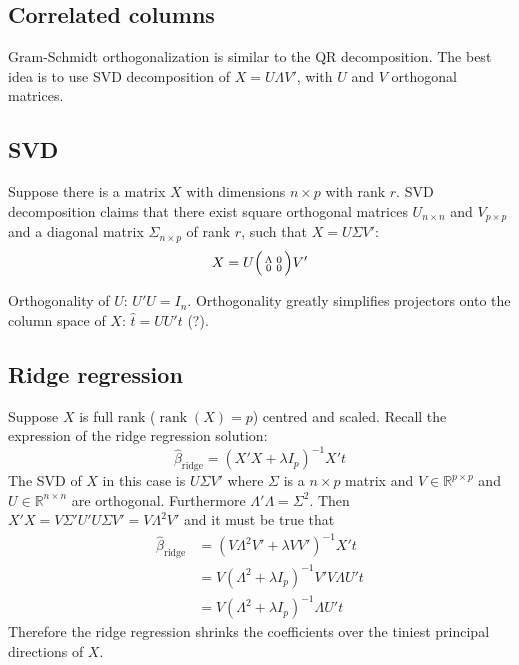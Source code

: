 \documentclass[a4paper]{article}
\newcommand{\Real}{\mathbb{R}}
\newcommand{\rank}{\mathop{\text{rank}}\nolimits}
\begin{document}

\subsection*{Correlated columns} %
\label{sub:correlated_columns}

Gram-Schmidt orthogonalization is similar to the QR decomposition. The best idea
is to use SVD decomposition of $X = U\Lambda V'$, with $U$ and $V$ orthogonal
matrices.

\subsection*{SVD} %
\label{sub:svd}

Suppose there is a matrix $X$ with dimensions $n\times p$ with rank $r$.
SVD decomposition claims that there exist square orthogonal matrices $U_{n\times n}$
and $V_{p\times p}$ and a diagonal matrix $\Sigma_{n\times p}$ of rank $r$, such
that $X = U \Sigma V'$:
\[X = U \Bigl(\begin{smallmatrix} \Lambda & 0\\ 0 & 0 \end{smallmatrix}\Bigr) V'\]

Orthogonality of $U$: $U'U = I_n$. Orthogonality greatly simplifies projectors
onto the column space of $X$: $\hat{t} = U U' t$ (?).


\subsection*{Ridge regression} %
\label{sub:ridge_regression}

Suppose $X$ is full rank ($\rank(X) = p$) centred and scaled. Recall the expression
of the ridge regression solution:
\[\hat{\beta}_\text{ridge} = (X'X + \lambda I_p)^{-1} X't\]
The SVD of $X$ in this case is $U\Sigma V'$ where $\Sigma$ is a $n\times p$ 
matrix and $V \in \Real^{p\times p}$ and $U \in \Real^{n\times n}$ are orthogonal.
Furthermore $\Lambda'\Lambda = \Sigma^2$. Then $X'X = V\Sigma' U' U \Sigma V' = V\Lambda^2 V'$
and it must be true that 
\begin{align*}
	\hat{\beta}_{\text{ridge}}
	& = (V\Lambda^2 V' + \lambda VV')^{-1} X't\\
	& = V (\Lambda^2 + \lambda I_p)^{-1} V' V\Lambda U't \\
	& = V (\Lambda^2 + \lambda I_p)^{-1} \Lambda U't
\end{align*}
Therefore the ridge regression shrinks the coefficients over the tiniest principal
directions of $X$.
\end{document}
